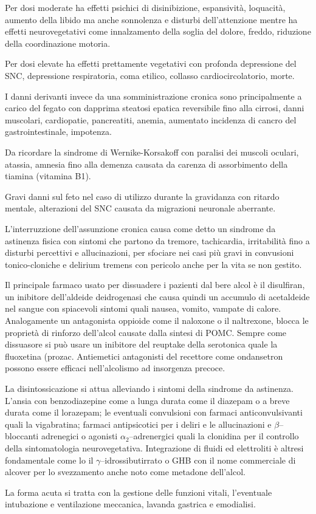 Per dosi moderate ha effetti psichici di disinibizione, espansività, loquacità, aumento della libido ma anche sonnolenza e disturbi dell'attenzione mentre ha effetti neurovegetativi come innalzamento della soglia del dolore, freddo, riduzione della coordinazione motoria.

Per dosi elevate ha effetti prettamente vegetativi con profonda depressione del SNC, depressione respiratoria, coma etilico, collasso cardiocircolatorio, morte.

I danni derivanti invece da una somministrazione cronica sono principalmente a carico del fegato con dapprima steatosi epatica reversibile fino alla cirrosi, danni muscolari, cardiopatie, pancreatiti, anemia, aumentato incidenza di cancro del gastrointestinale, impotenza.

Da ricordare la sindrome di Wernike-Korsakoff con paralisi dei muscoli oculari, atassia, amnesia fino alla demenza causata da carenza di assorbimento della tiamina (vitamina B1).

Gravi danni sul feto nel caso di utilizzo durante la gravidanza con ritardo mentale, alterazioni del SNC causata da migrazioni neuronale aberrante.

L'interruzzione dell'assunzione cronica causa come detto un sindrome da astinenza fisica con sintomi che partono da tremore, tachicardia, irritabilità fino a disturbi percettivi e allucinazioni, per sfociare nei casi più gravi in convusioni tonico-cloniche e delirium tremens con pericolo anche per la vita se non gestito.

Il principale farmaco usato per dissuadere i pazienti dal bere alcol è il disulfiran, un inibitore dell'aldeide deidrogenasi che causa quindi un accumulo di acetaldeide nel sangue con spiacevoli sintomi quali nausea, vomito, vampate di calore. Analogamente un antagonista oppioide come il naloxone o il naltrexone, blocca le proprietà di rinforzo dell'alcol causate dalla sintesi di POMC. Sempre come dissuasore si può usare un inibitore del reuptake della serotonica quale la fluoxetina (prozac. Antiemetici antagonisti del recettore  come ondansetron possono essere efficaci nell'alcolismo ad insorgenza precoce.

La disintossicazione si attua alleviando i sintomi della sindrome da astinenza. L'ansia con benzodiazepine come a lunga durata come il diazepam o a breve durata come il lorazepam; le eventuali convulsioni con farmaci anticonvulsivanti quali la vigabratina; farmaci antipsicotici per i deliri e le allucinazioni e $\beta$--bloccanti adrenegici o agonisti $\alpha_2$--adrenergici quali la clonidina per il controllo della sintomatologia neurovegetativa. Integrazione di fluidi ed elettroliti è altresi fondamentale come lo il $\gamma$--idrossibutirrato o GHB con il nome commerciale di alcover per lo svezzamento anche noto come metadone dell'alcol.

La forma acuta si tratta con la gestione delle funzioni vitali, l'eventuale intubazione e ventilazione meccanica, lavanda gastrica e emodialisi.


\newpage